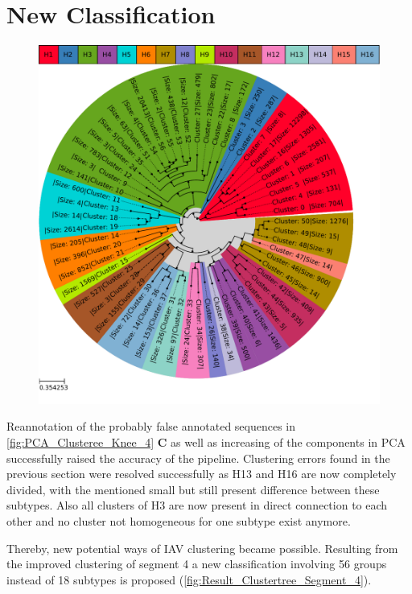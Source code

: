 \section{New Classification} \label{sec:Serotype_Classification}

\begin{figure}[!hbt]
    \centering
    \includegraphics[width=\textwidth]{Results/Clustertree_Segment_4.pdf}
    \caption[]{}
    \label{fig:Result_Clustertree_Segment_4}
\end{figure}

Reannotation of the probably false annotated sequences in \autoref{fig:PCA_Clusteree_Knee_4} \textbf{\textsf{C}} as well as increasing of the components in \gls{PCA} successfully raised the accuracy of the pipeline. Clustering errors found in the previous section were resolved successfully as H13 and H16 are now completely divided, with the mentioned small but still present difference between these subtypes. Also all clusters of H3 are now present in direct connection to each other and no cluster not homogeneous for one subtype exist anymore. 

Thereby, new potential ways of \gls{IAV} clustering became possible. Resulting from the improved clustering of segment 4 a new classification involving 56 groups instead of 18 subtypes is proposed (\autoref{fig:Result_Clustertree_Segment_4}).


